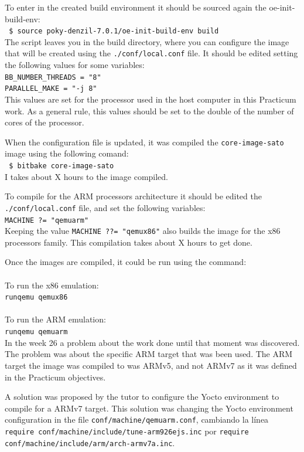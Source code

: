 \documentclass[a4paper,11pt,openany]{report}
\begin{document}
To enter in the created build environment it should be sourced again the oe-init-build-env:\\
\verb# $ source poky-denzil-7.0.1/oe-init-build-env build #\\

The script leaves you in the build directory, where you can configure the image that will be created using the \verb#./conf/local.conf# file. It should be edited setting the following values for some variables:\\
\verb#BB_NUMBER_THREADS = "8"#\\
\verb#PARALLEL_MAKE = "-j 8"#\\

This values are set for the processor used in the host computer in this Practicum work. As a general rule, this values should be set to the double of the number of cores of the processor.

When the configuration file is updated, it was compiled the \verb#core-image-sato# image using the following comand:\\
\verb# $ bitbake core-image-sato #\\

I takes about X hours to the image compiled.

To compile for the ARM processors architecture it should be edited the \verb#./conf/local.conf# file, and set the following variables:\\
\verb#MACHINE ?= "qemuarm"#\\

Keeping the value \verb#MACHINE ??= "qemux86"# also builds the image for the x86 processors family. This compilation takes about X hours to get done.

Once the images are compiled, it could be run using the command:\\
\\
To run the x86 emulation:\\
\verb#runqemu qemux86#\\
\\
To run the ARM emulation:\\
\verb#runqemu qemuarm#\\

In the week 26 a problem about the work done until that moment was discovered. The problem was about the specific ARM target that was been used. The ARM target the image was compiled to was ARMv5, and not ARMv7 as it was defined in the Practicum objectives.

A solution was proposed by the tutor to configure the Yocto environment to compile for a ARMv7 target. This solution was changing the Yocto environment configuration in the file \verb#conf/machine/qemuarm.conf#, cambiando la línea \verb#require conf/machine/include/tune-arm926ejs.inc# por \verb#require conf/machine/include/arm/arch-armv7a.inc#.
\end{document}
